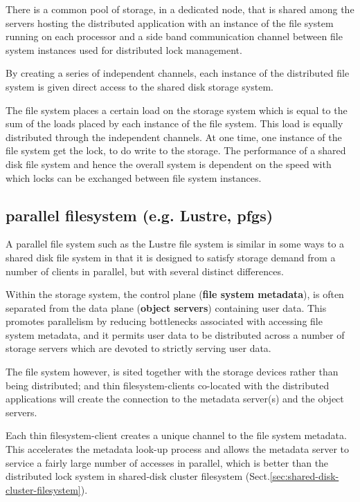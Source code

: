 There is a common pool of storage, in a dedicated node, that is shared among the
servers hosting the distributed application with an instance of the file
system running on each processor and a side band communication channel between
file system instances used for distributed lock management.

By creating a series of independent channels, each instance of the distributed
file system is given direct access to the shared disk storage system.

The file system places a certain load on the storage system which is equal to
the sum of the loads placed by each instance of the file system. This load  is
equally distributed through the independent channels.
At one time, one instance of the file system get the lock, to do write to the
storage.
The performance of a shared disk file system and hence the overall system is
dependent on the speed with which locks can be exchanged between file system
instances.



\subsection{parallel filesystem (e.g. Lustre, pfgs)}
\label{sec:parallel-filesystem}

A parallel file system such as the Lustre file system is similar in some ways 
to a shared disk file system in that it is designed to satisfy storage demand 
from a number of clients in parallel, but with several distinct differences. 

Within the storage system, the control plane ({\bf file system metadata}), is
often separated from the data plane ({\bf object servers}) containing user data.
This promotes parallelism by reducing bottlenecks associated with accessing file
system metadata, and it permits user data to be distributed across a number of
storage servers which are devoted to strictly serving user data.

The file system however, is sited together with the storage 
devices rather than being distributed; and thin filesystem-clients 
co-located with the distributed applications will create the connection to the
metadata server(s) and the object servers.

Each thin filesystem-client creates a unique channel to the file system
metadata. This accelerates the metadata look-up process and allows the metadata
server to service a fairly large number of accesses in parallel, which is
better than the distributed lock system in shared-disk cluster filesystem
(Sect.\ref{sec:shared-disk-cluster-filesystem}).


